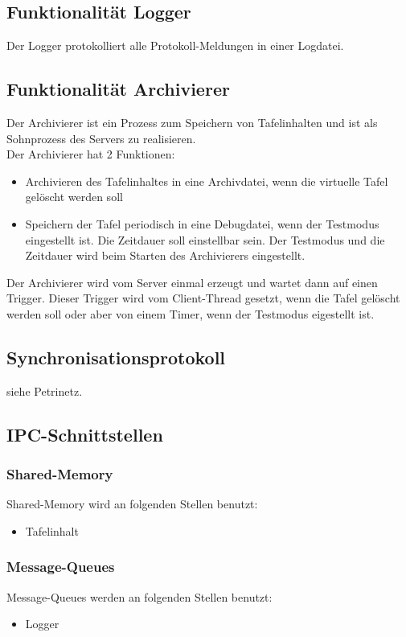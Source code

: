 \subsection{Funktionalität Logger}
Der Logger protokolliert alle Protokoll-Meldungen in einer Logdatei.

\subsection{Funktionalität Archivierer}
Der Archivierer ist ein Prozess zum Speichern von Tafelinhalten und ist als Sohnprozess des Servers zu realisieren. \\
Der Archivierer hat 2 Funktionen:
\begin{itemize}
 \item Archivieren des Tafelinhaltes in eine Archivdatei, wenn die virtuelle Tafel gelöscht werden soll
 \item Speichern der Tafel periodisch in eine Debugdatei, wenn der Testmodus eingestellt ist. Die Zeitdauer soll 
einstellbar sein. Der Testmodus und die Zeitdauer wird beim Starten des Archivierers eingestellt.
\end{itemize}
Der Archivierer wird vom Server einmal erzeugt und wartet dann auf einen Trigger. Dieser Trigger wird vom Client-Thread 
gesetzt, wenn die Tafel gelöscht werden soll oder aber von einem Timer, wenn der Testmodus eigestellt ist.

\subsection{Synchronisationsprotokoll}
siehe Petrinetz.

\subsection{IPC-Schnittstellen}

\subsubsection{Shared-Memory}
Shared-Memory wird an folgenden Stellen benutzt:
\begin{itemize}
 \item Tafelinhalt
\end{itemize}

\subsubsection{Message-Queues}
Message-Queues werden an folgenden Stellen benutzt:
\begin{itemize}
 \item Logger
\end{itemize}
